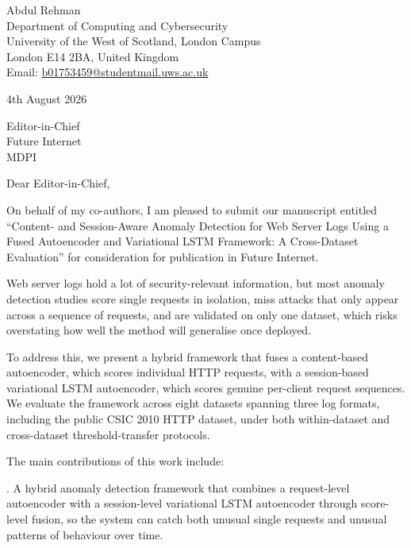\documentclass[11pt]{article}
\begin{document}
\noindent
Abdul Rehman \\
Department of Computing and Cybersecurity \\
University of the West of Scotland, London Campus \\
London E14 2BA, United Kingdom \\
Email: \href{mailto:b01753459@studentmail.uws.ac.uk}{b01753459@studentmail.uws.ac.uk}

\vspace{2\baselineskip}

4th August 2026

\vspace{2\baselineskip}

\noindent
Editor-in-Chief \\
Future Internet \\
MDPI

\vspace{2\baselineskip}

Dear Editor-in-Chief,

\vspace{\baselineskip}

On behalf of my co-authors, I am pleased to submit our manuscript entitled ``Content- and Session-Aware Anomaly Detection for Web Server Logs Using a Fused Autoencoder and Variational LSTM Framework: A Cross-Dataset Evaluation'' for consideration for publication in Future Internet.

Web server logs hold a lot of security-relevant information, but most anomaly detection studies score single requests in isolation, miss attacks that only appear across a sequence of requests, and are validated on only one dataset, which risks overstating how well the method will generalise once deployed.

To address this, we present a hybrid framework that fuses a content-based autoencoder, which scores individual HTTP requests, with a session-based variational LSTM autoencoder, which scores genuine per-client request sequences. We evaluate the framework across eight datasets spanning three log formats, including the public CSIC 2010 HTTP dataset, under both within-dataset and cross-dataset threshold-transfer protocols.

The main contributions of this work include:

\vspace{0.5\baselineskip}

. A hybrid anomaly detection framework that combines a request-level autoencoder with a session-level variational LSTM autoencoder through score-level fusion, so the system can catch both unusual single requests and unusual patterns of behaviour over time.
\end{document}

